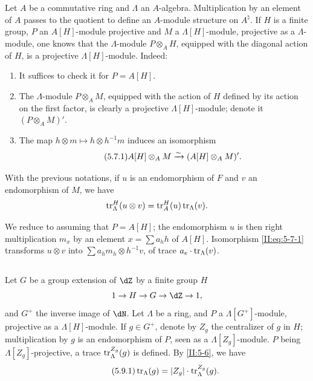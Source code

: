 Let $A$ be a commutative ring and $\Lambda$ an $A$-algebra. Multiplication
by an element of $A$ passes to the quotient to define an $A$-module
structure on $A^\natural$. If $H$ is a finite group, $P$ an $A[H]$-module
projective and $M$ a $\Lambda[H]$-module, projective as a $\Lambda$-module,
one knows that the $\Lambda$-module $P\otimes_A H$, equipped with the diagonal action of
$H$, is a projective $\Lambda[H]$-module. Indeed:
\begin{enumerate}[\indent a)]
  \item It suffices to check it for $P=A[H]$.
  \item The $\Lambda$-module $P\otimes_A M$, equipped with the action of $H$ defined
    by its action on the first factor, is clearly a
    projective $\Lambda[H]$-module; denote it $(P\otimes_A M)'$.
  \item The map $h\otimes m\mapsto h\otimes h^{-1} m$ induces an
    isomorphism
    \begin{equation*}\tag{5.7.1}\label{II:eq:5-7-1}
      A[H]\otimes_A M \xrightarrow\sim (A[H]\otimes_A M)' \text{.}
    \end{equation*}
\end{enumerate}




\begin{proposition_}\label{II:5-8}
With the previous notations, if $u$ is an endomorphism of $F$ and
$v$ an endomorphism of $M$, we have
\[
  \operatorname{tr}_\Lambda^H(u\otimes v) = \operatorname{tr}_A^H(u)\operatorname{tr}_\Lambda(v) \text{.}
\]
\end{proposition_}

We reduce to assuming that $P=A[H]$; the endomorphism $u$ is then right
multiplication $m_x$ by an element $x=\sum a_h h$ of $A[H]$.
Isomorphism \eqref{II:eq:5-7-1} transforms $u\otimes v$ into
$\sum a_h m_h\otimes h^{-1} v$, of trace $a_e\cdot\operatorname{tr}_\Lambda(v)$.




\subsection{}\label{II:5-9}

Let $G$ be a group extension of $\dZ$ by a finite group $H$
\[
  1 \to H \to G \to \dZ \to 1 \text{,}
\]
and $G^+$ the inverse image of $\dN$. Let $\Lambda$ be a ring, and $P$ a
$\Lambda[G^+]$-module, projective as a $\Lambda[H]$-module. If
$g\in G^+$, denote by $Z_g$ the centralizer of $g$ in $H$; multiplication
by $g$ is an endomorphism of $P$, seen as a $\Lambda[Z_g]$-module. $P$ being
$\Lambda[Z_g]$-projective, a trace $\operatorname{tr}_\Lambda^{Z_g}(g)$ is defined.
By \ref{II:5-6}, we have
\begin{equation*}\tag{5.9.1}\label{II:eq:5-9-1}
  \operatorname{tr}_\Lambda(g) = |Z_g| \cdot \operatorname{tr}_\Lambda^{Z_g}(g) \text{.}
\end{equation*}

